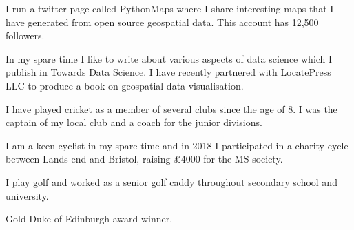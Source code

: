 \begin{cventries}
  \cventry
    {}
    {}
    {}
    {}
    {
      \begin{cvitems}
        \item {I run a twitter page called PythonMaps where I share interesting maps that I have generated from open source geospatial data. This account has 12,500 followers.} 
        \item {In my spare time I like to write about various aspects of data science which I publish in Towards Data Science. I have recently partnered with LocatePress LLC to produce a book on geospatial data visualisation.}
        \item {I have played cricket as a member of several clubs since the age of 8. I was the captain of my local club and a coach for the junior divisions.}
        \item {I am a keen cyclist in my spare time and in 2018 I participated in a charity cycle between Lands end and Bristol, raising £4000 for the MS society.}
        \item {I play golf and worked as a senior golf caddy throughout secondary school and university.}
        \item {Gold Duke of Edinburgh award winner.}
      \end{cvitems}
    }
\end{cventries}

